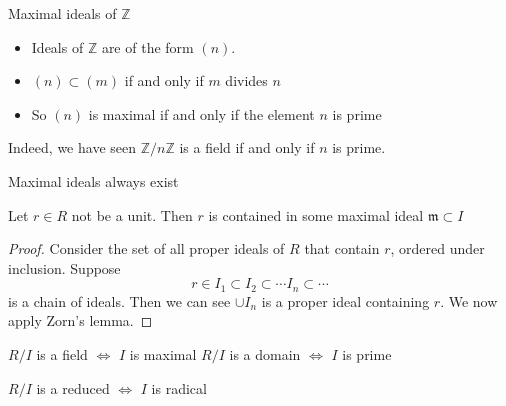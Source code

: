 \documentclass{beamer}
\begin{document}
\begin{frame}{Maximal ideals of $\mathbb{Z}$}

\begin{itemize}
\item Ideals of $\mathbb{Z}$ are of the form $(n)$.
\item $(n)\subset (m)$ if and only if $m$ divides $n$
\item So $(n)$ is maximal if and only if the element $n$ is prime
\end{itemize}

Indeed, we have seen $\mathbb{Z}/n\mathbb{Z}$ is a field if and only if $n$ is prime.

\end{frame}

\begin{frame}{Maximal ideals always exist}
\begin{lemma} Let $r\in R$ not be a unit.  Then $r$ is contained in some maximal ideal $\mathfrak{m}\subset I$
\end{lemma}

\begin{proof} Consider the set of all proper ideals of $R$ that contain $r$, ordered under inclusion.  Suppose 
$$r\in I_1\subset I_2\subset\cdots I_n\subset \cdots $$
is a chain of ideals.  Then we can see $\cup I_n$ is a proper ideal containing $r$.  We now apply Zorn's lemma.
\end{proof}

\end{frame}


\begin{frame}[plain, c]


\huge
\begin{center}

$R/I$ is a field $\iff$ $I$ is maximal
{ $R/I$ is a domain $\iff$ $I$ is prime}

$R/I$ is a reduced $\iff$ $I$ is radical

\end{center}
\end{frame}
\end{document}
